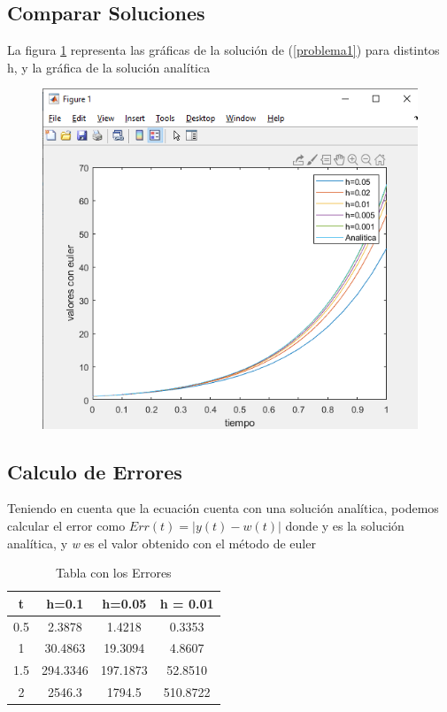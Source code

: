 \documentclass[12pt]{article}
\begin{document}
\subsection{Comparar Soluciones}
La figura \ref{graf2} representa las gráficas de la solución de (\ref{problema1}) para distintos h, y la gráfica de la solución analítica
\begin{figure}[h]
	\centering
	\caption{}
	\includegraphics[scale=0.52]{graf2.png}
	\label{graf2}
\end{figure}
\subsection{Calculo de Errores}
Teniendo en cuenta que la ecuación cuenta con una solución analítica, podemos calcular el error como $Err(t) = |y(t)-w(t)|$ donde y es la solución analítica, y \textit{w} es el valor obtenido con el método de euler
\begin{table}[h]
	\centering
	\begin{tabular}{|c|c|c|c|}
		\hline
		t & h=0.1 & h=0.05 & h = 0.01 \\
		\hline
		0.5&2.3878&1.4218&0.3353\\
		\hline
		1&30.4863&19.3094&4.8607\\
		\hline
		1.5&294.3346&197.1873&52.8510\\
		\hline
		2&2546.3&1794.5&510.8722\\
		\hline
	\end{tabular}
\caption{Tabla con los Errores}
\end{table}
\end{document}
